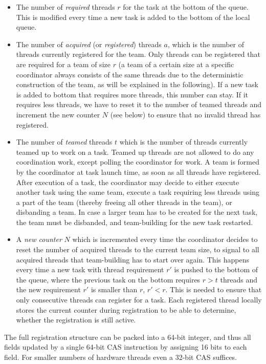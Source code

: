 \documentclass[preprint]{sigplanconf}
\begin{document}
\begin{itemize}
\item 
The number of \emph{required} threads $r$ for the task at the bottom
of the queue. This is modified every time a new task is added to the
bottom of the local queue.
\item
The number of \emph{acquired} (or \emph{registered}) threads $a$,
which is the number of threads currently registered for the team. Only
threads can be registered that are required for a team of size $r$ (a
team of a certain size at a specific coordinator always consists of
the same threads due to the deterministic construction of the team, as
will be explained in the following). If a new task is added to bottom
that requires more threads, this number can stay. If it requires less
threads, we have to reset it to the number of teamed threads and
increment the new counter $N$ (see below) to ensure that no invalid
thread has registered.
\item 
The number of \emph{teamed} threads $t$ which is the number of threads
currently teamed up to work on a task. Teamed up threads are not
allowed to do any coordination work, except polling the coordinator
for work. A team is formed by the coordinator at task launch time, as
soon as all threads have registered. After execution of a task, the
coordinator may decide to either execute another task using the same
team, execute a task requiring less threads using a part of the team
(thereby freeing all other threads in the team), or disbanding a
team. In case a larger team has to be created for the next task, the
team must be disbanded, and team-building for the new task restarted.
\item A \emph{new counter} $N$ which is incremented every time the
coordinator decides to reset the number of acquired threads to the
current team size, to signal to all acquired threads that
team-building has to start over again. This happens every time a new
task with thread requirement $r'$ is pushed to the bottom of the
queue, where the previous task on the bottom requires $r>t$ threads
and the new requirement $r'$ is smaller than $r$, $r'<r$.  This is
needed to ensure that only consecutive threads can register for a
task. Each registered thread locally stores the current counter during
registration to be able to determine, whether the registration is
still active.
\end{itemize}

The full registration structure can be packed into a 64-bit integer,
and thus all fields updated by a single 64-bit CAS instruction by
assigning 16 bits to each field. For smaller numbers of hardware
threads even a 32-bit CAS suffices.
\end{document}
